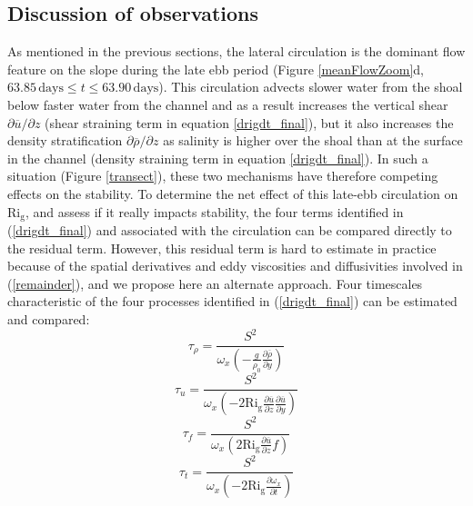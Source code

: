 \subsection{Discussion of observations}
\label{discussionCirculationTurbulence}

As mentioned in the previous sections, the lateral circulation is the dominant flow feature on the slope during the late ebb period (Figure {\ref{meanFlowZoom}d, $63.85\, \mathrm{days} \leq t \leq 63.90 \, \mathrm{days}$}). This circulation advects slower water from the shoal below faster water from the channel and as a result increases the vertical shear $\partial \overline{u} / \partial z$ (shear straining term in equation \ref{drigdt_final}), but it also increases the density stratification $\partial \overline{\rho} / \partial z$ as salinity is higher over the shoal than at the surface in the channel (density straining term in equation \ref{drigdt_final}). In such a situation (Figure \ref{transect}), these two mechanisms have therefore competing effects on the stability. To determine the net effect of this late-ebb circulation on $\mathrm{Ri_g}$, and assess if it really impacts stability, the four terms identified in (\ref{drigdt_final}) and associated with the circulation can be compared directly to the residual term. However, this residual term is hard to estimate in practice because of the spatial derivatives and eddy viscosities and diffusivities involved in (\ref{remainder}), and we propose here an alternate approach. Four timescales characteristic of the four processes identified in (\ref{drigdt_final}) can be estimated and compared:
\begin{equation}
\tau_{\rho} = \frac{S^2}{\omega_{x}\left(-\frac{g}{\rho_{0}}\frac{\partial \overline{\rho}}{\partial y}\right)}
\label{tau_density}
\end{equation}
\begin{equation}
\tau_{u} = \frac{S^2}{\omega_{x}\left(-2\mathrm{Ri_g}\frac{\partial \overline{u}}{\partial z}\frac{\partial \overline{u}}{\partial y}\right)}
\label{tau_shear}
\end{equation}
\begin{equation}
\tau_{f} = \frac{S^2}{\omega_{x}\left(2\mathrm{Ri_g}\frac{\partial \overline{u}}{\partial z}f\right)}
\label{tau_rotation}
\end{equation}
\begin{equation}
\tau_{t} = \frac{S^2}{\omega_{x}\left(-2\mathrm{Ri_g} \frac{\partial \omega_x}{\partial t}\right)}
\label{tau_unsteadiness}
\end{equation}

